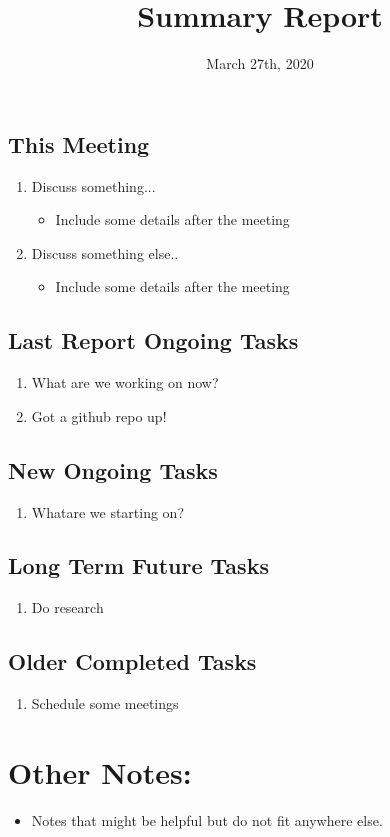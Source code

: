 \documentclass{article}
\title{\vspace{-0.75in} Summary Report}
\date{\vspace{-0.5in} March 27th, 2020}
\newcommand{\checkeditem}{\item[\refstepcounter{enumi}$\text{\rlap{$\boxtimes$}}\square$]}
\begin{document}

\maketitle


\subsection*{This Meeting} 
\begin{enumerate}[label={$\square$}]  \itemsep0em 
	\checkeditem Discuss something...
	\begin{itemize}
		\item Include some details after the meeting
	\end{itemize}
	\checkeditem Discuss something else..
	\begin{itemize}
		\item  Include some details after the meeting
	\end{itemize}
\end{enumerate}

\subsection*{Last Report Ongoing Tasks} 
\begin{enumerate}[label={$\square$}]  \itemsep0em 
	\item What are we working on now?\
   	\checkeditem Got a github repo up!
\end{enumerate}

\subsection*{New Ongoing Tasks}
\begin{enumerate}[label={$\square$}]  \itemsep0em
	\item Whatare we starting on?
\end{enumerate}

\subsection*{Long Term Future Tasks}
\begin{enumerate}[label={$\square$}] \itemsep0em 
	\item Do research
\end{enumerate}

\subsection*{Older Completed Tasks} 
\begin{enumerate}[label={$\square$}] \itemsep0em 
   \checkeditem Schedule some meetings
\end{enumerate}

\section*{Other Notes:}
\begin{itemize}
	\item Notes that might be helpful but do not fit anywhere else.
\end{itemize}
\end{document}
